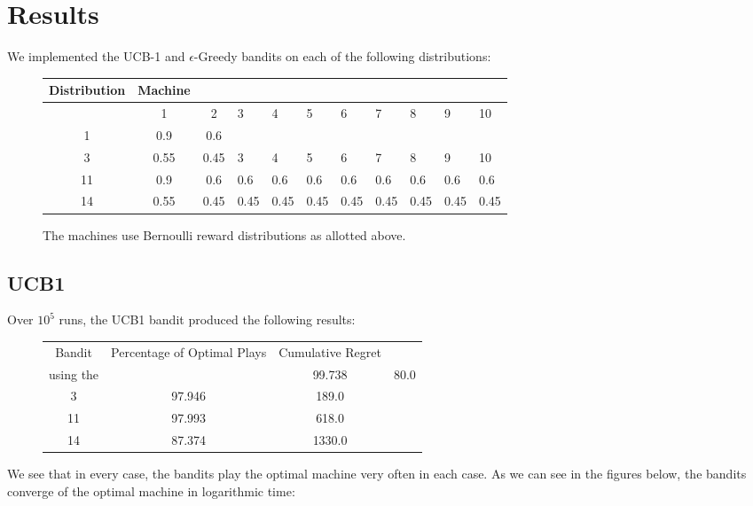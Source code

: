 
\section{Results}
\label{sec:results}

We implemented the UCB-1 and $\epsilon$-Greedy bandits on each of the following distributions:

\begin{figure}[htb]
  \centering
  \begin{tabular}{|c|c|c|} 
    \hline \hline     
    Distribution & Machine  \\ 
    \hline 
     & 1 & 2 & 3 & 4 & 5 & 6 & 7 & 8 & 9 & 10 \\
    1 & 0.9 & 0.6 &  &  &  &  &  &  &  &  \\
    3 & 0.55 & 0.45 & 3 & 4 & 5 & 6 & 7 & 8 & 9 & 10 \\
    11 & 0.9 & 0.6 & 0.6 & 0.6 & 0.6 & 0.6 & 0.6 & 0.6 & 0.6 & 0.6 \\
    14 & 0.55 & 0.45 & 0.45 & 0.45 & 0.45 & 0.45 & 0.45 & 0.45 & 0.45 & 0.45 \\
    \hline \hline
  \end{tabular}
  \caption{The machines use Bernoulli reward distributions as allotted above.}
  \label{tab:Bernoulli Reward Distributions}
\end{figure}

\subsection{UCB1}
\label{subsec:UCB1}

Over $10^5$ runs, the UCB1 bandit produced the following results:

\begin{figure}[htb]
  \centering
  \begin{tabular}{|c|c|c|} 
    \hline \hline     Bandit & Percentage of Optimal Plays &  Cumulative Regret \\  using the &
     & 99.738 & 80.0 \\
     3 & 97.946 & 189.0 \\
     11 & 97.993 & 618.0 \\
     14 & 87.374 & 1330.0 \\
    \hline \hline
  \end{tabular}
  \label{tab:Statistics for UCB1 Bandits}
\end{figure}

We see that in every case, the bandits play the optimal machine very often in each case. As we can see in the figures below, the bandits converge of the optimal machine in logarithmic time:

